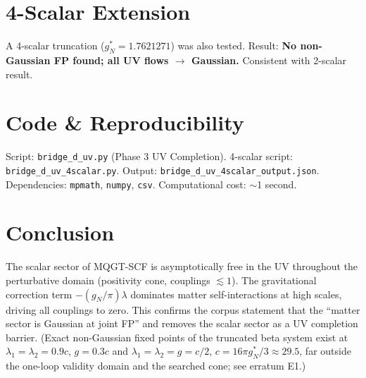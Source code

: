 \documentclass[11pt]{article}
\begin{document}
\section{4-Scalar Extension}
A 4-scalar truncation ($g_N^* = 1.7621271$) was also tested. Result: \textbf{No non-Gaussian FP found; all UV flows $\to$ Gaussian.} Consistent with 2-scalar result.

\section{Code \& Reproducibility}
Script: \texttt{bridge\_d\_uv.py} (Phase 3 UV Completion). 4-scalar script: \texttt{bridge\_d\_uv\_4scalar.py}. Output: \texttt{bridge\_d\_uv\_4scalar\_output.json}. Dependencies: \texttt{mpmath}, \texttt{numpy}, \texttt{csv}. Computational cost: $\sim$1 second.

\section{Conclusion}
The scalar sector of MQGT-SCF is asymptotically free in the UV throughout the perturbative domain (positivity cone, couplings $\lesssim 1$). The gravitational correction term $-(g_N/\pi)\lambda$ dominates matter self-interactions at high scales, driving all couplings to zero. This confirms the corpus statement that the ``matter sector is Gaussian at joint FP'' and removes the scalar sector as a UV completion barrier. (Exact non-Gaussian fixed points of the truncated beta system exist at $\lambda_1=\lambda_2=0.9c$, $g=0.3c$ and $\lambda_1=\lambda_2=g=c/2$, $c=16\pi g_N^*/3\approx 29.5$, far outside the one-loop validity domain and the searched cone; see erratum E1.)



\end{document}
